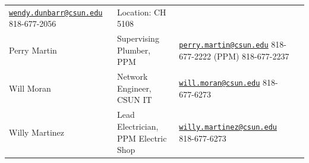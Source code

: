 \documentclass[]{book}
\begin{document}
\begin{longtable}[]{@{}llll@{}}
\begin{minipage}[t]{0.28\columnwidth}
\href{mailto:wendy.dunbarr@csun.edu}{\nolinkurl{wendy.dunbarr@csun.edu}}
818-677-2056\strut
\end{minipage} & \begin{minipage}[t]{0.18\columnwidth}\raggedright\strut
Location: CH 5108\strut
\end{minipage}\tabularnewline
\begin{minipage}[t]{0.18\columnwidth}\raggedright\strut
Perry Martin\strut
\end{minipage} & \begin{minipage}[t]{0.25\columnwidth}\raggedright\strut
Supervising Plumber, PPM\strut
\end{minipage} & \begin{minipage}[t]{0.28\columnwidth}\raggedright\strut
\href{mailto:perry.martin@csun.edu}{\nolinkurl{perry.martin@csun.edu}}
818-677-2222 (PPM) 818-677-2237\strut
\end{minipage} & \begin{minipage}[t]{0.18\columnwidth}\raggedright\strut
\strut
\end{minipage}\tabularnewline
\begin{minipage}[t]{0.18\columnwidth}\raggedright\strut
Will Moran\strut
\end{minipage} & \begin{minipage}[t]{0.25\columnwidth}\raggedright\strut
Network Engineer, CSUN IT\strut
\end{minipage} & \begin{minipage}[t]{0.28\columnwidth}\raggedright\strut
\href{mailto:will.moran@csun.edu}{\nolinkurl{will.moran@csun.edu}}
818-677-6273\strut
\end{minipage} & \begin{minipage}[t]{0.18\columnwidth}\raggedright\strut
\strut
\end{minipage}\tabularnewline
\begin{minipage}[t]{0.18\columnwidth}\raggedright\strut
Willy Martinez\strut
\end{minipage} & \begin{minipage}[t]{0.25\columnwidth}\raggedright\strut
Lead Electrician, PPM Electric Shop\strut
\end{minipage} & \begin{minipage}[t]{0.28\columnwidth}\raggedright\strut
\href{mailto:willy.martinez@csun.edu}{\nolinkurl{willy.martinez@csun.edu}}
818-677-6273\strut
\end{minipage} & \begin{minipage}[t]{0.18\columnwidth}\raggedright\strut

\end{minipage}
\end{longtable}
\end{document}
